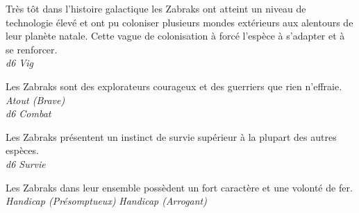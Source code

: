 \begin{description}[align=left]
	\item [Endurance] 				%
		Très tôt dans l’histoire galactique les Zabraks ont atteint un niveau de technologie élevé et ont pu coloniser plusieurs mondes extérieurs aux alentours de leur planète natale. Cette vague de colonisation à forcé l’espèce à s’adapter et à se renforcer.\\
		\emph{d6 Vig}

	\item [Braveheart] 				%
		Les Zabraks sont des explorateurs courageux et des guerriers que rien n’effraie.\\
		\emph{Atout (Brave)}\\
		\emph{d6 Combat}

	\item [Survivor] 				%
		Les Zabraks présentent un instinct de survie supérieur à la plupart des autres espèces.\\
		\emph{d6 Survie}

	\item [Fierté mal placé] 				%
		Les Zabraks dans leur ensemble possèdent un fort caractère et une volonté de fer.\\
		\emph{Handicap (Présomptueux)}
		\emph{Handicap (Arrogant)}
\end{description}